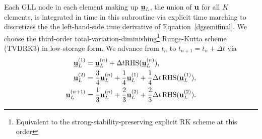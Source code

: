 Each GLL node in each element making up
${\underline {\bf u}}_L$, the union of ${\bf u}$ for all $K$ elements, is integrated in time in this subroutine
via explicit time marching to discretizes the
the left-hand-side time derivative of Equation~\ref{dgsemifinal}.
We choose the third-order total-variation-diminishing\footnote{Equivalent to
the strong-stability-preserving explicit RK scheme at this order} Runge-Kutta scheme (TVDRK3) in low-storage form.
We advance from $t_n$ to $t_{n+1}=t_n+\Delta t$ via
\begin{align}
{\underline {\bf u}}_L^{(1)}&={\underline {\bf u}}_L^{(n)}+\Delta t \mbox{RHS}({\underline {\bf u}}_L^{(n)}), \nonumber \\
{\underline {\bf u}}_L^{(2)}&=\frac{3}{4}{\underline {\bf u}}_L^{(n)}+\frac{1}{4}{\underline {\bf u}}_L^{(1)}+\frac{1}{4}\Delta t\, \mbox{RHS}({\underline {\bf u}}_L^{(1)}), \label{eq:rk3} \\
{\underline {\bf u}}_L^{(n+1)}&=\frac{1}{3}{\underline {\bf u}}_L^{(n)}+\frac{2}{3}{\underline {\bf u}}_L^{(2)}+\frac{2}{3}\Delta t\, \mbox{RHS}({\underline {\bf u}}_L^{(2)}). \nonumber
\end{align}
